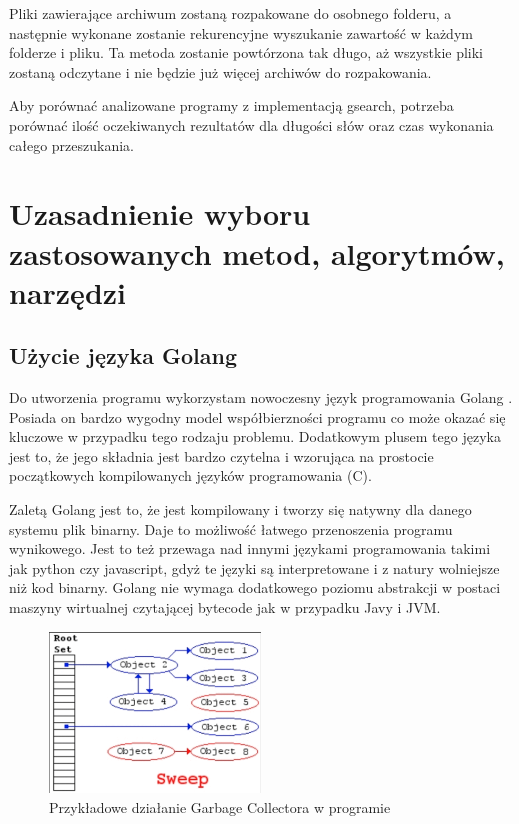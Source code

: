 Pliki zawierające archiwum zostaną rozpakowane do osobnego folderu, a następnie
wykonane zostanie rekurencyjne wyszukanie zawartość w każdym folderze i pliku.
Ta metoda zostanie powtórzona tak długo, aż wszystkie pliki zostaną odczytane 
i nie będzie już więcej archiwów do rozpakowania.

Aby porównać analizowane programy z implementacją gsearch, potrzeba porównać
ilość oczekiwanych rezultatów dla długości słów oraz czas wykonania całego 
przeszukania.

\section{Uzasadnienie wyboru zastosowanych metod, algorytmów, narzędzi}

\subsection{Użycie języka Golang}

Do utworzenia programu wykorzystam nowoczesny język programowania Golang \cite{bib:internet:golang}.
Posiada on bardzo wygodny model współbierzności programu co może okazać się 
kluczowe w przypadku tego rodzaju problemu. Dodatkowym plusem tego języka jest
to, że jego składnia jest bardzo czytelna i wzorująca na prostocie początkowych
kompilowanych języków programowania (C).

Zaletą Golang jest to, że jest kompilowany i tworzy się natywny dla danego 
systemu plik binarny. Daje to możliwość łatwego przenoszenia programu wynikowego.
Jest to też przewaga nad innymi językami programowania takimi jak python czy
javascript, gdyż te języki są interpretowane i z natury wolniejsze niż kod 
binarny. Golang nie wymaga dodatkowego poziomu abstrakcji w postaci maszyny 
wirtualnej czytającej bytecode jak w przypadku Javy i JVM.

\begin{figure}[h]
\centering
\includegraphics[width=0.5\textwidth]{./images/GarbageCollector.png}
\caption{Przykładowe działanie Garbage Collectora w programie}
\label{fig:GarbageCollectorImage}
\end{figure}

